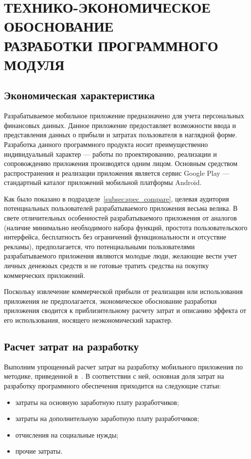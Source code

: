 \section[Технико-экономическое обоснование]{%
  ТЕХНИКО-ЭКОНОМИЧЕСКОЕ ОБОСНОВАНИЕ \\
  РАЗРАБОТКИ ПРОГРАММНОГО МОДУЛЯ
}\label{sec:teo}

\subsection{Экономическая характеристика}

Разрабатываемое мобильное приложение предназначено для учета
персональных финансовых данных.
Данное приложение предоставляет возможности ввода и представления
данных о прибыли и затратах пользователя в наглядной форме.
Разработка данного программного продукта носит преимущественно
индивидуальный характер --- работы по проектированию, реализации и
сопровождению приложения производятся одним лицом.
Основным средством распространения и реализации приложения является сервис
Google Play --- стандартный каталог приложений мобильной платформы Android.

Как было показано в подразделе~\ref{subsec:spec_compare}, целевая аудитория
потенциальных пользователей разрабатываемого приложения весьма велика.
В свете отличительных особенностей разрабатываемого приложения от аналогов
(наличие минимально необходимого набора функций,
простота пользовательского интерфейса,
бесплатность без ограничений функциональности и отсуствие рекламы),
предполагается, что потенциальными пользователями разрабатываемого
приложения являются молодые люди, желающие вести учет личных денежных
средств и не готовые тратить средства на покупку коммерческих приложений.

Поскольку извлечение коммерческой прибыли от реализации или использования приложения
не предполагается, экономическое обоснование разработки приложения
сводится к приблизительному расчету затрат и описанию эффекта от его использования,
носящего неэкономический характер.

\subsection{Расчет затрат на разработку}

Выполним упрощенный расчет затрат на разработку мобильного приложения
по методике, приведенной в~\cite{diploma_teo}. В соответствии с ней,
основная доля затрат на разработку программного обеспечения приходится
на следующие статьи:
\begin{itemize}
  \item затраты на основную заработную плату разработчиков;
  \item затраты на дополнительную заработную плату разработчиков;
  \item отчисления на социальные нужды;
  \item прочие затраты.
\end{itemize}

